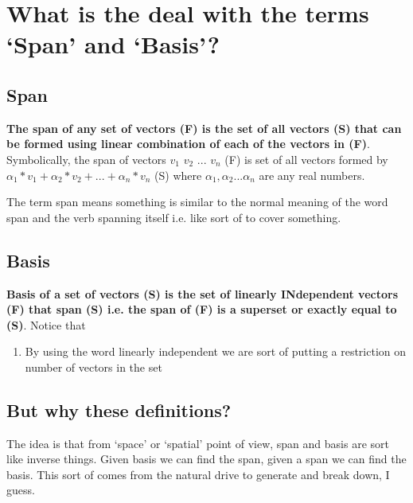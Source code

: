 \documentclass[../main.tex]{subfiles}
\begin{document}
\chapter{What is the deal with the terms `Span' and `Basis'?}

\section{Span}
\textbf{The span of any set of vectors (F) is the set of all vectors (S) that can be formed using linear combination of each of the vectors in (F)}. Symbolically, the span of vectors $ v_1 $ $ v_2 $ ... $ v_n $ (F) is set of all vectors formed by $ \alpha_1 * v_1 + \alpha_2 * v_2 + ... + \alpha_n * v_n $ (S) where $ \alpha_1, \alpha_2 ... \alpha_n $ are any real numbers.

The term span means something is similar to the normal meaning of the word span and the verb spanning itself i.e. like sort of to cover something.

\section{Basis}
\textbf{Basis of a set of vectors (S) is the set of linearly INdependent vectors (F) that span (S) i.e. the span of (F) is a superset or exactly equal to (S)}. Notice that
\begin{enumerate}
  \item By using the word linearly independent we are sort of putting a restriction on number of vectors in the set
\end{enumerate}

\section{But why these definitions?}
The idea is that from `space' or `spatial' point of view, span and basis are sort like inverse things. Given basis we can find the span, given a span we can find the basis. This sort of comes from the natural drive to generate and break down, I guess.
\end{document}

